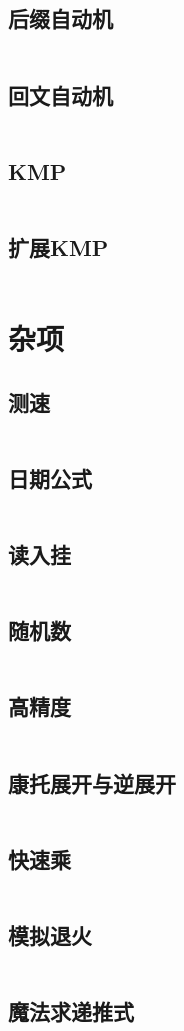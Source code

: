\documentclass[UTF8]{ctexart}
\begin{document}
\subsection{后缀自动机}
\inputminted{cpp}{string/后缀自动机.cpp}
\subsection{回文自动机}
\inputminted{cpp}{string/回文自动机.cpp}
\subsection{KMP}
\inputminted{cpp}{string/KMP.cpp}
\subsection{扩展KMP}
\inputminted{cpp}{string/扩展KMP.cpp}
\section{杂项}
\subsection{测速}
\inputminted{cpp}{others/chrono.cpp}
\subsection{日期公式}
\inputminted{cpp}{others/date.cpp}
\subsection{读入挂}
\inputminted{cpp}{others/fread.cpp}
\subsection{随机数}
\inputminted{cpp}{others/随机数.cpp}
\subsection{高精度}
\inputminted{cpp}{others/高精度1.cpp}
\subsection{康托展开与逆展开}
\inputminted{cpp}{others/康托展开与康托逆展开.cpp}
\subsection{快速乘}
\inputminted{cpp}{others/快速乘.cpp}
\subsection{模拟退火}
\inputminted{cpp}{others/模拟退火.cpp}
\subsection{魔法求递推式}
\inputminted{cpp}{others/魔法求递推式.cpp}


\end{document}
